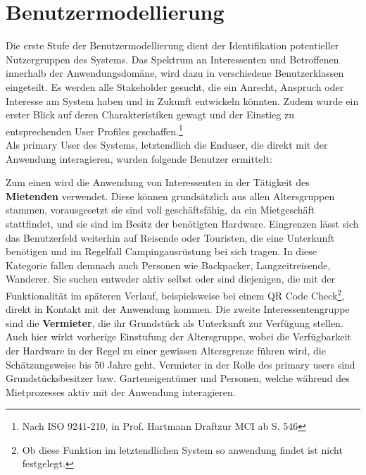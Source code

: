 
\section{Benutzermodellierung}
Die erste Stufe der Benutzermodellierung dient der Identifikation potentieller Nutzergruppen des Systems.
Das Spektrum an Interessenten und Betroffenen innerhalb der Anwendungsdomäne, wird dazu in
verschiedene Benutzerklassen eingeteilt. Es werden alle Stakeholder gesucht, die ein Anrecht, Anspruch oder Interesse am System haben und in Zukunft entwickeln könnten. Zudem wurde ein erster Blick auf deren Charakteristiken gewagt und der Einstieg zu entsprechenden User Profiles geschaffen.\footnote{Nach ISO 9241-210, in Prof. Hartmann Draftzur MCI ab S. 546}\\
 
Als primary User des Systems, letztendlich die Enduser, die direkt mit der Anwendung interagieren, wurden folgende Benutzer ermittelt:
 
Zum einen wird die Anwendung von Interessenten in der Tätigkeit des \textbf{Mietenden} verwendet.
Diese können grundsätzlich aus allen Altersgruppen stammen, vorausgesetzt sie sind voll geschäftsfähig, da ein Mietgeschäft stattfindet, und sie sind im Besitz der benötigten Hardware.
Eingrenzen lässt sich das Benutzerfeld weiterhin auf Reisende oder Touristen, die eine Unterkunft benötigen und im Regelfall Campingausrüstung bei sich tragen. In diese Kategorie fallen demnach auch Personen wie Backpacker, Langzeitreisende, Wanderer.
Sie suchen entweder aktiv selbst oder sind diejenigen, die mit der Funktionalität im späteren Verlauf, beispielsweise bei einem QR Code Check\footnote{Ob diese Funktion im letztendlichen System so anwendung findet ist nicht festgelegt.}, direkt in Kontakt mit der Anwendung kommen.
 Die zweite Interessentengruppe sind die \textbf{Vermieter}, die ihr Grundstück als Unterkunft zur Verfügung stellen. Auch hier wirkt vorherige Einstufung der Altersgruppe, wobei die Verfügbarkeit der Hardware in der Regel zu einer gewissen Altersgrenze führen wird, die Schätzungsweise bis 50 Jahre geht.
Vermieter in der Rolle des primary users sind Grundstücksbesitzer bzw. Garteneigentümer und Personen, welche während des Mietprozesses aktiv mit der Anwendung interagieren.\\
 
